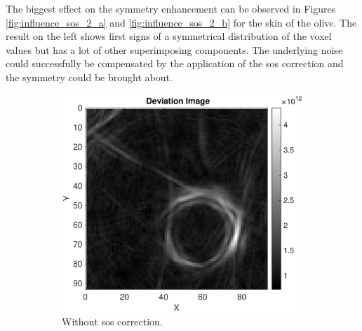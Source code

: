The biggest effect on the symmetry enhancement can be observed in Figures \ref{fig:influence_sos_2_a} and \ref{fig:influence_sos_2_b} for the skin of the olive. The result on the left shows first signs of a symmetrical distribution of the voxel values but has a lot of other superimposing components. The underlying noise could successfully be compensated by the application of the \ac{sos} correction and the symmetry could be brought about. 


\begin{figure}[H]
     \centering
     \begin{subfigure}[b]{0.47\textwidth}
              \centering
         \includegraphics[width=1.09\textwidth]{Graphics/Results/14_vecs_sos_vs_noSos/Deviation_14vecs_no_sos_z_direction.eps}
         \caption{Without \ac{sos} correction.}
         \label{leer}
     \end{subfigure}
     \hfill
     \begin{subfigure}[b]{0.47\textwidth}
         \centering

\end{subfigure}
\end{figure}
